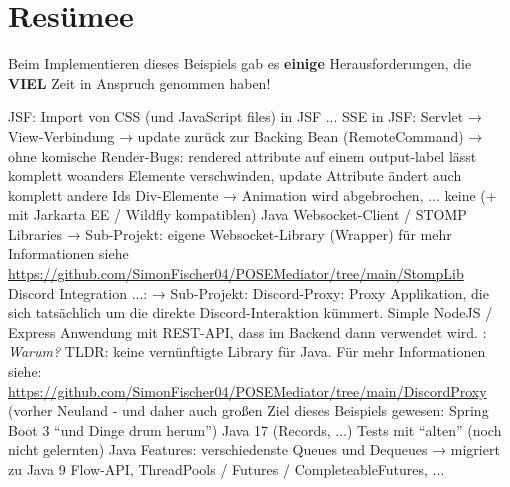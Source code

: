 \chapter{Resümee}\label{ref:resumee}
Beim Implementieren dieses Beispiels gab es \textbf{einige} Herausforderungen, die \textbf{VIEL} Zeit in Anspruch genommen haben!
\begin{outline}
    \1 JSF:
        \2 Import von CSS (und JavaScript files) in JSF ...
        \2 SSE in JSF: Servlet → View-Verbindung → update zurück zur Backing Bean (RemoteCommand)
            \3 → ohne komische Render-Bugs: rendered attribute auf einem output-label lässt komplett woanders Elemente verschwinden, update Attribute ändert auch komplett andere Ids Div-Elemente → Animation wird abgebrochen, ...
    \1 keine (+ mit Jarkarta EE / Wildfly kompatiblen) Java Websocket-Client / STOMP Libraries
        \2 → Sub-Projekt: eigene Websocket-Library (Wrapper) für mehr Informationen siehe \url{https://github.com/SimonFischer04/POSEMediator/tree/main/StompLib}
    \1 Discord Integration ...:
        \2 → Sub-Projekt: Discord-Proxy: Proxy Applikation, die sich tatsächlich um die direkte Discord-Interaktion kümmert. Simple NodeJS / Express Anwendung mit REST-API, dass im Backend dann verwendet wird. : 
        \2 \textit{Warum?} TLDR: keine vernünftigte Library für Java. Für mehr Informationen siehe: \url{https://github.com/SimonFischer04/POSEMediator/tree/main/DiscordProxy}
    \1 (vorher Neuland - und daher auch großen Ziel dieses Beispiels gewesen: Spring Boot 3 \enquote{und Dinge drum herum})
        \2 Java 17 (Records, ...)
        \2 Tests mit \enquote{alten} (noch nicht gelernten) Java Features: verschiedenste Queues und Dequeues → migriert zu Java 9 Flow-API, ThreadPools / Futures / CompleteableFutures, ...
\end{outline}